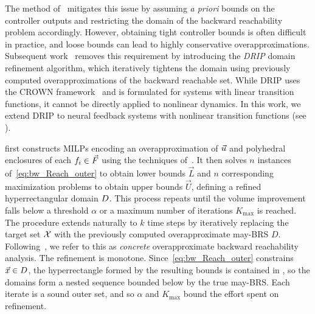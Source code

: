 \documentclass[letterpaper, 10 pt, conference]{ieeeconf}  %
\begin{document}
The method of~\cite{rober2023backward} mitigates this issue by assuming \emph{a priori} bounds on the controller outputs and restricting the domain of the backward reachability problem accordingly. However, obtaining tight controller bounds is often difficult in practice, and loose bounds can lead to highly conservative overapproximations. Subsequent work~\cite{everett2023drip} removes this requirement by introducing the \emph{DRIP} domain refinement algorithm, which iteratively tightens the domain using previously computed overapproximations of the backward reachable set. While DRIP uses the CROWN framework~\cite{zhang2018efficient} and is formulated for systems with linear transition functions, it cannot be directly applied to nonlinear dynamics. In this work, we extend DRIP to neural feedback systems with nonlinear transition functions (see ).

 first constructs MILPs encoding an overapproximation of $\vec{u}$ and polyhedral enclosures of each $f_i \in \vec{F}$ using the techniques of~\cite{akinwande2025verifying}. It then solves $n$ instances of~\eqref{eq:bw_Reach_outer} to obtain lower bounds $\vec{L}$ and $n$ corresponding maximization problems to obtain upper bounds $\vec{U}$, defining a refined hyperrectangular domain $D$. This process repeats until the volume improvement falls below a threshold $\alpha$ or a maximum number of iterations $K_{\max}$ is reached. The procedure extends naturally to $k$ time steps by iteratively replacing the target set $\mathcal{X}$ with the previously computed overapproximate may-BRS $D$. Following~\cite{sidrane2022overt}, we refer to this as \emph{concrete} overapproximate backward reachability analysis.
The refinement is monotone. Since~\eqref{eq:bw_Reach_outer} constrains $\vec{x} \in D$, the hyperrectangle formed by the resulting bounds is contained in \dom, so the domains form a nested sequence bounded below by the true may-BRS. Each iterate is a sound outer set, and so $\alpha$ and $K_{\max}$ bound the effort spent on refinement.
\end{document}
